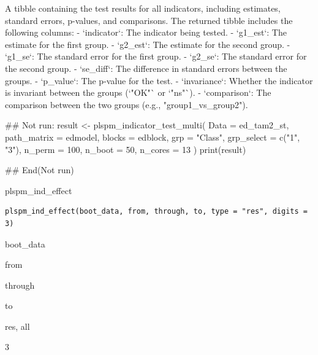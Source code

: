 \documentclass[a4paper]{book}
\begin{document}
%
\begin{Value}
A tibble containing the test results for all indicators, including estimates, standard errors, p-values, and comparisons.
The returned tibble includes the following columns:
- `indicator`: The indicator being tested.
- `g1\_est`: The estimate for the first group.
- `g2\_est`: The estimate for the second group.
- `g1\_se`: The standard error for the first group.
- `g2\_se`: The standard error for the second group.
- `se\_diff`: The difference in standard errors between the groups.
- `p\_value`: The p-value for the test.
- `invariance`: Whether the indicator is invariant between the groups (`"OK"` or `"ns"`).
- `comparison`: The comparison between the two groups (e.g., "group1\_vs\_group2").
\end{Value}
%
\begin{Examples}
\begin{ExampleCode}
## Not run: 
result <- plspm_indicator_test_multi(
  Data = ed_tam2_st,
  path_matrix = edmodel,
  blocks = edblock,
  grp = "Class",
  grp_select = c("1", "3"),
  n_perm = 100,
  n_boot = 50,
  n_cores = 13
)
print(result)

## End(Not run)
\end{ExampleCode}
\end{Examples}
%
\begin{Description}
plspm\_ind\_effect
\end{Description}
%
\begin{Usage}
\begin{verbatim}
plspm_ind_effect(boot_data, from, through, to, type = "res", digits = 3)
\end{verbatim}
\end{Usage}
%
\begin{Arguments}
\begin{ldescription}
\item[\code{boot\_data}] boot\_data

\item[\code{from}] from

\item[\code{through}] through

\item[\code{to}] to

\item[\code{type}] res, all

\item[\code{digits}] 3
\end{ldescription}
\end{Arguments}
\end{document}
